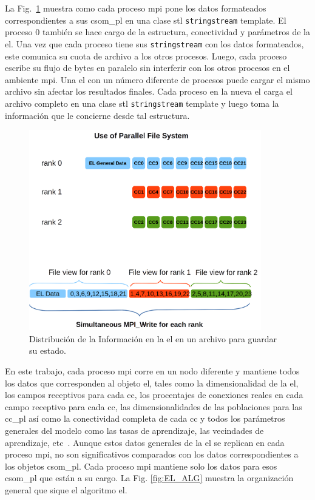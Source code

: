 {La Fig.~\ref{fig:MPI_IO} muestra como cada proceso \gls{mpi} pone los datos formateados correspondientes a sus \gls{csom_pl} en una clase \gls{stl} \texttt{stringstream} template.
El proceso 0 también se hace cargo de la estructura, conectividad y parámetros de la \gls{el}.
Una vez que cada proceso tiene sus \texttt{stringstream} con los datos formateados, este comunica su cuota de archivo a los otros procesos.
Luego, cada proceso escribe su flujo de bytes en paralelo sin interferir con los otros procesos en el ambiente \gls{mpi}.
Una \gls{el} con un número diferente de procesos puede cargar el mismo archivo sin afectar los resultados finales.
Cada proceso en la nueva \gls{el} carga el archivo completo en una clase \gls{stl} \texttt{stringstream} template y luego toma la información que le concierne desde tal estructura.

\begin{figure}[h!]
    \centering
    \includegraphics[width=0.9\textwidth]{MPI_IO.png}
    \caption{Distribución de la Información en la \gls{el} en un archivo para guardar su estado.}
    \label{fig:MPI_IO}
\end{figure}

En este trabajo, cada proceso \gls{mpi} corre en un nodo diferente y mantiene todos los datos que corresponden al objeto \gls{el}, tales como la dimensionalidad de la \gls{el}, los campos receptivos para cada \gls{cc}, los procentajes de conexiones reales en cada campo receptivo para cada \gls{cc}, las dimensionalidades de las poblaciones para las \gls{cc_pl} así como la conectividad completa de cada \gls{cc} y todos los parámetros generales del modelo como las tasas de aprendizaje, las vecindades de aprendizaje, etc~\cite{10.1371/journal.pone.0217966}.
Aunque estos datos generales de la \gls{el} se replican en cada proceso \gls{mpi}, no son significativos comparados con los datos correspondientes a los objetos \gls{csom_pl}.
Cada proceso \gls{mpi} mantiene solo los datos para esos \gls{csom_pl} que están a su cargo.
La Fig. \ref{fig:EL_ALG} muestra la organización general que sique el algoritmo \gls{el}.

}
